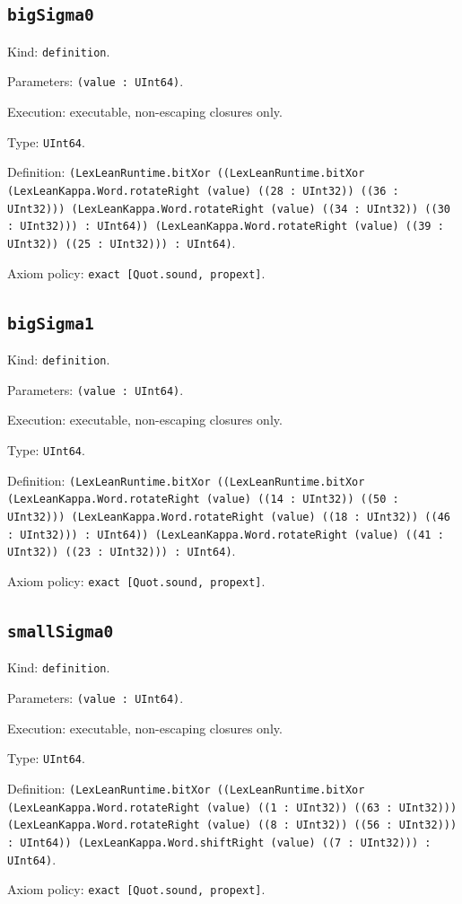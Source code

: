 \documentclass[11pt]{article}
\begin{document}
\subsection*{\texttt{bigSigma0}}
\noindent Kind: \texttt{definition}.\par
\noindent Parameters: \texttt{(value : UInt64)}.\par
\noindent Execution: executable, non-escaping closures only.\par
\noindent Type: \texttt{UInt64}.\par
\noindent Definition: \texttt{(LexLeanRuntime.bitXor ((LexLeanRuntime.bitXor (LexLeanKappa.Word.rotateRight (value) ((28 : UInt32)) ((36 : UInt32))) (LexLeanKappa.Word.rotateRight (value) ((34 : UInt32)) ((30 : UInt32))) : UInt64)) (LexLeanKappa.Word.rotateRight (value) ((39 : UInt32)) ((25 : UInt32))) : UInt64)}.\par
\noindent Axiom policy: \texttt{exact [Quot.sound, propext]}.\par
\subsection*{\texttt{bigSigma1}}
\noindent Kind: \texttt{definition}.\par
\noindent Parameters: \texttt{(value : UInt64)}.\par
\noindent Execution: executable, non-escaping closures only.\par
\noindent Type: \texttt{UInt64}.\par
\noindent Definition: \texttt{(LexLeanRuntime.bitXor ((LexLeanRuntime.bitXor (LexLeanKappa.Word.rotateRight (value) ((14 : UInt32)) ((50 : UInt32))) (LexLeanKappa.Word.rotateRight (value) ((18 : UInt32)) ((46 : UInt32))) : UInt64)) (LexLeanKappa.Word.rotateRight (value) ((41 : UInt32)) ((23 : UInt32))) : UInt64)}.\par
\noindent Axiom policy: \texttt{exact [Quot.sound, propext]}.\par
\subsection*{\texttt{smallSigma0}}
\noindent Kind: \texttt{definition}.\par
\noindent Parameters: \texttt{(value : UInt64)}.\par
\noindent Execution: executable, non-escaping closures only.\par
\noindent Type: \texttt{UInt64}.\par
\noindent Definition: \texttt{(LexLeanRuntime.bitXor ((LexLeanRuntime.bitXor (LexLeanKappa.Word.rotateRight (value) ((1 : UInt32)) ((63 : UInt32))) (LexLeanKappa.Word.rotateRight (value) ((8 : UInt32)) ((56 : UInt32))) : UInt64)) (LexLeanKappa.Word.shiftRight (value) ((7 : UInt32))) : UInt64)}.\par
\noindent Axiom policy: \texttt{exact [Quot.sound, propext]}.\par
\end{document}
